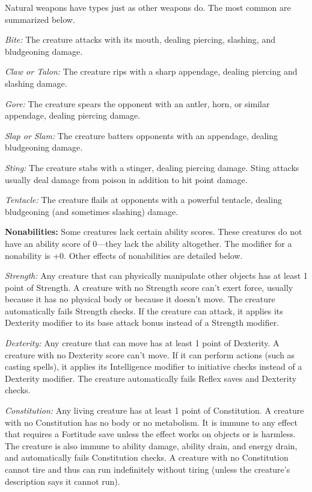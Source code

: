 \documentclass{article}
\begin{document}
Natural weapons have types just as other weapons do. The most common are summarized 
below.

\textit{Bite: }The creature attacks with its mouth, dealing piercing, slashing, 
and bludgeoning damage.

\textit{Claw or Talon: }The creature rips with a sharp appendage, dealing piercing 
and slashing damage.

\textit{Gore: }The creature spears the opponent with an antler, horn, or similar 
appendage, dealing piercing damage.

\textit{Slap or Slam: }The creature batters opponents with an appendage, dealing 
bludgeoning damage.

\textit{Sting: }The creature stabs with a stinger, dealing piercing damage. Sting 
attacks usually deal damage from poison in addition to hit point damage.

\textit{Tentacle: }The creature flails at opponents with a powerful tentacle, dealing 
bludgeoning (and sometimes slashing) damage. 

\vspace{12pt}
\textbf{Nonabilities:} Some creatures lack certain ability scores. These creatures 
do not have an ability score of 0---they lack the ability altogether. The modifier 
for a nonability is +0. Other effects of nonabilities are detailed below.

\textit{Strength: }Any creature that can physically manipulate other objects has 
at least 1 point of Strength. A creature with no Strength score can't exert force, 
usually because it has no physical body or because it doesn't move. The creature 
automatically fails Strength checks. If the creature can attack, it applies its 
Dexterity modifier to its base attack bonus instead of a Strength modifier.

\textit{Dexterity: }Any creature that can move has at least 1 point of Dexterity. 
A creature with no Dexterity score can't move. If it can perform actions (such 
as casting spells), it applies its Intelligence modifier to initiative checks instead 
of a Dexterity modifier. The creature automatically fails Reflex saves and Dexterity 
checks.

\textit{Constitution: }Any living creature has at least 1 point of Constitution. 
A creature with no Constitution has no body or no metabolism. It is immune to any 
effect that requires a Fortitude save unless the effect works on objects or is 
harmless. The creature is also immune to ability damage, ability drain, and energy 
drain, and automatically fails Constitution checks. A creature with no Constitution 
cannot tire and thus can run indefinitely without tiring (unless the creature's 
description says it cannot run).
\end{document}
